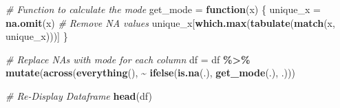 \documentclass[
]{article}
\newenvironment{Shaded}{\begin{snugshade}}{\end{snugshade}}
\newcommand{\CommentTok}[1]{\textcolor[rgb]{0.56,0.35,0.01}{\textit{#1}}}
\newcommand{\ControlFlowTok}[1]{\textcolor[rgb]{0.13,0.29,0.53}{\textbf{#1}}}
\newcommand{\FunctionTok}[1]{\textcolor[rgb]{0.13,0.29,0.53}{\textbf{#1}}}
\newcommand{\NormalTok}[1]{#1}
\newcommand{\OtherTok}[1]{\textcolor[rgb]{0.56,0.35,0.01}{#1}}
\newcommand{\SpecialCharTok}[1]{\textcolor[rgb]{0.81,0.36,0.00}{\textbf{#1}}}
\begin{document}
\begin{Shaded}
\begin{Highlighting}[]
\CommentTok{\# Function to calculate the mode}
\NormalTok{get\_mode }\OtherTok{=} \ControlFlowTok{function}\NormalTok{(x) \{}
\NormalTok{  unique\_x }\OtherTok{=} \FunctionTok{na.omit}\NormalTok{(x)  }\CommentTok{\# Remove NA values}
\NormalTok{  unique\_x[}\FunctionTok{which.max}\NormalTok{(}\FunctionTok{tabulate}\NormalTok{(}\FunctionTok{match}\NormalTok{(x, unique\_x)))]}
\NormalTok{\}}

\CommentTok{\# Replace NAs with mode for each column}
\NormalTok{df }\OtherTok{=}\NormalTok{ df }\SpecialCharTok{\%\textgreater{}\%}
  \FunctionTok{mutate}\NormalTok{(}\FunctionTok{across}\NormalTok{(}\FunctionTok{everything}\NormalTok{(), }\SpecialCharTok{\textasciitilde{}} \FunctionTok{ifelse}\NormalTok{(}\FunctionTok{is.na}\NormalTok{(.), }\FunctionTok{get\_mode}\NormalTok{(.), .)))}

\CommentTok{\# Re{-}Display Dataframe}
\FunctionTok{head}\NormalTok{(df)}
\end{Highlighting}
\end{Shaded}
\end{document}

